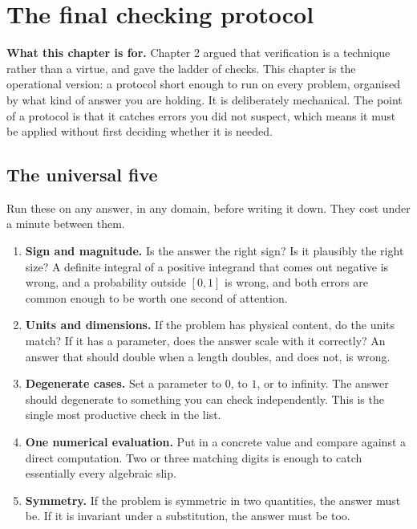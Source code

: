 \chapter{The final checking protocol}

\begin{orient}
\textbf{What this chapter is for.} Chapter 2 argued that verification is a technique rather than a virtue, and gave the ladder of checks. This chapter is the operational version: a protocol short enough to run on every problem, organised by what kind of answer you are holding. It is deliberately mechanical. The point of a protocol is that it catches errors you did not suspect, which means it must be applied without first deciding whether it is needed.
\end{orient}

\section{The universal five}

Run these on any answer, in any domain, before writing it down. They cost under a minute between them.

\begin{enumerate}[label=\textbf{\arabic*.},leftmargin=2.0em]
\item \textbf{Sign and magnitude.} Is the answer the right sign? Is it plausibly the right size? A definite integral of a positive integrand that comes out negative is wrong, and a probability outside $[0,1]$ is wrong, and both errors are common enough to be worth one second of attention.
\item \textbf{Units and dimensions.} If the problem has physical content, do the units match? If it has a parameter, does the answer scale with it correctly? An answer that should double when a length doubles, and does not, is wrong.
\item \textbf{Degenerate cases.} Set a parameter to $0$, to $1$, or to infinity. The answer should degenerate to something you can check independently. This is the single most productive check in the list.
\item \textbf{One numerical evaluation.} Put in a concrete value and compare against a direct computation. Two or three matching digits is enough to catch essentially every algebraic slip.
\item \textbf{Symmetry.} If the problem is symmetric in two quantities, the answer must be. If it is invariant under a substitution, the answer must be too.
\end{enumerate}


